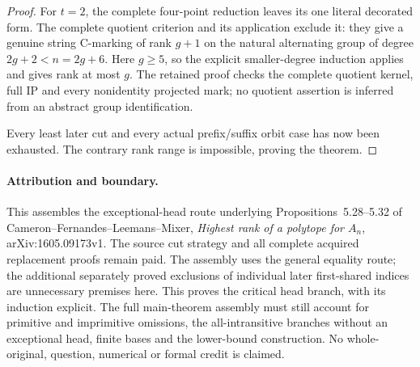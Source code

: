 \documentclass[11pt,a4paper]{article}
\begin{document}
\begin{proof}
For $t=2$, the complete four-point reduction leaves its
one literal decorated form. The complete quotient criterion
and its application exclude it: they give a genuine string
C-marking of rank $g+1$ on the natural alternating group
of degree $2g+2<n=2g+6$. Here $g\ge5$, so the explicit
smaller-degree induction applies and gives rank at most $g$.
The retained proof checks the complete quotient kernel, full IP
and every nonidentity projected mark; no quotient assertion is
inferred from an abstract group identification.

Every least later cut and every actual prefix/suffix orbit
case has now been exhausted. The contrary rank range is
impossible, proving the theorem.
\end{proof}

\paragraph{Attribution and boundary.}
This assembles the exceptional-head route underlying
Propositions~5.28--5.32 of Cameron--Fernandes--Leemans--Mixer,
\emph{Highest rank of a polytope for $A_n$}, arXiv:1605.09173v1.
The source cut strategy and all complete acquired replacement
proofs remain paid. The assembly uses the general equality route;
the additional separately proved exclusions of individual later
first-shared indices are unnecessary premises here.
This proves the critical head branch, with its induction explicit.
The full main-theorem assembly must still account for primitive
and imprimitive omissions, the all-intransitive branches without
an exceptional head, finite bases and the lower-bound construction.
No whole-original, question, numerical or formal credit is claimed.
\end{document}
